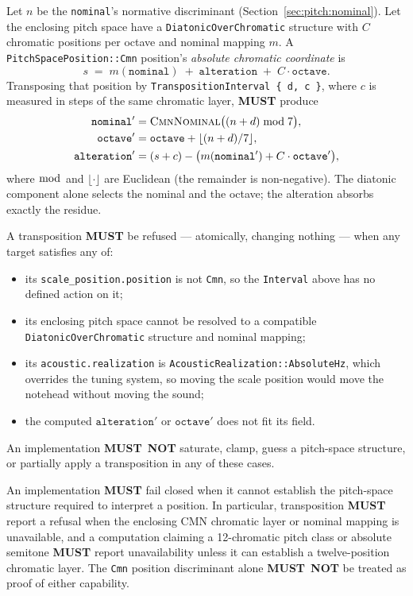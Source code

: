 \documentclass[11pt,letterpaper]{report}
\newcounter{requirement}[chapter]
\newcommand{\MUST}{\textbf{MUST}}
\newcommand{\MUSTNOT}{\textbf{MUST}\nobreak\ \textbf{NOT}}
\begin{document}
\begin{requirement}
  \label{req:pitch:transposition}
  Let $n$ be the \texttt{nominal}'s normative discriminant
  (Section~\ref{sec:pitch:nominal}). Let the enclosing pitch space have a
  \texttt{DiatonicOverChromatic} structure with $C$ chromatic positions per
  octave and nominal mapping $m$. A
  \texttt{PitchSpacePosition::Cmn} position's \emph{absolute chromatic
  coordinate} is
  \[
    s \;=\; m(\texttt{nominal}) \;+\; \texttt{alteration}
        \;+\; C \cdot \texttt{octave}.
  \]
  Transposing that position by \texttt{TranspositionInterval \{ d, c \}},
  where $c$ is measured in steps of the same chromatic layer, \MUST{} produce
  \begin{align*}
    \texttt{nominal}' &= \textsc{CmnNominal}\big((n + d) \bmod 7\big), \\
    \texttt{octave}'  &= \texttt{octave} + \lfloor (n + d) / 7 \rfloor, \\
    \texttt{alteration}' &= (s + c) -
      \big(m(\texttt{nominal}') + C \cdot \texttt{octave}'\big),
  \end{align*}
  where $\bmod$ and $\lfloor \cdot \rfloor$ are Euclidean (the remainder is
  non-negative). The diatonic component alone selects the nominal and the
  octave; the alteration absorbs exactly the residue.

  A transposition \MUST{} be refused --- atomically, changing nothing --- when
  any target satisfies any of:
  \begin{itemize}
    \item its \texttt{scale\_position.position} is not \texttt{Cmn}, so the
      \texttt{Interval} above has no defined action on it;
    \item its enclosing pitch space cannot be resolved to a compatible
      \texttt{DiatonicOverChromatic} structure and nominal mapping;
    \item its \texttt{acoustic.realization} is
      \texttt{AcousticRealization::AbsoluteHz}, which overrides the tuning
      system, so moving the scale position would move the notehead without
      moving the sound;
    \item the computed $\texttt{alteration}'$ or $\texttt{octave}'$ does not
      fit its field.
  \end{itemize}
  An implementation \MUSTNOT{} saturate, clamp, guess a pitch-space
  structure, or partially apply a transposition in any of these cases.
\end{requirement}

\begin{requirement}
  \label{req:pitch:space-capability-refusal}
  An implementation \MUST{} fail closed when it cannot establish the
  pitch-space structure required to interpret a position. In particular,
  transposition \MUST{} report a refusal when the enclosing CMN chromatic
  layer or nominal mapping is unavailable, and a computation claiming a
  12-chromatic pitch class or absolute semitone \MUST{} report
  unavailability unless it can establish a twelve-position chromatic layer.
  The \texttt{Cmn} position discriminant alone \MUSTNOT{} be treated as proof
  of either capability.
\end{requirement}
\end{document}
